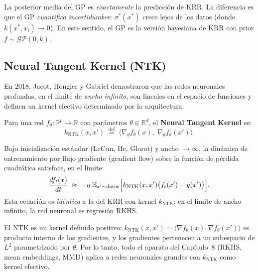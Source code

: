 \begin{remark}[GP $=$ KRR + incertidumbre]
	La posterior media del GP es \emph{exactamente} la predicci\'on de KRR.  La diferencia es que el GP \emph{cuantifica incertidumbre}: $\sigma^*(x^*)$ crece lejos de los datos (donde $k(x^*, x_i) \to 0$).  En este sentido, el GP es la versi\'on bayesiana de KRR con prior $f \sim \mathcal{GP}(0, k)$.
\end{remark}

\subsection*{Neural Tangent Kernel (NTK)}

En 2018, Jacot, Hongler y Gabriel demostraron que las redes neuronales profundas, en el l\'imite de \emph{ancho infinito}, son lineales en el espacio de funciones y definen un kernel efectivo determinado por la arquitectura.

\begin{definition}
	Para una red $f_\theta\colon \mathbb{R}^p \to \mathbb{R}$ con par\'ametros $\theta \in \mathbb{R}^d$, el \textbf{Neural Tangent Kernel} es:
	\[
	k_{\mathrm{NTK}}(x, x') \;\stackrel{\text{def}}{=}\; \bigl\langle \nabla_\theta f_\theta(x),\; \nabla_\theta f_\theta(x') \bigr\rangle.
	\]
\end{definition}

\begin{theorem}
	Bajo inicializaci\'on est\'andar (LeCun, He, Glorot) y ancho $\to \infty$, la din\'amica de entrenamiento por flujo gradiente (gradient flow) sobre la funci\'on de p\'erdida cuadr\'atica satisface, en el l\'imite:
	\[
	\frac{d f_t(x)}{dt} \;\approx\; -\eta\;\mathbb{E}_{x'\sim\text{datos}}\Bigl[k_{\mathrm{NTK}}(x, x')\bigl(f_t(x') - y(x')\bigr)\Bigr].
	\]
	Esta ecuaci\'on es \emph{id\'entica} a la del KRR con kernel $k_{\mathrm{NTK}}$: en el l\'imite de ancho infinito, la red neuronal es regresi\'on RKHS.
\end{theorem}

\begin{lemma}
	El NTK es un kernel definido positivo: $k_{\mathrm{NTK}}(x,x') = \langle \nabla f_\theta(x), \nabla f_\theta(x')\rangle$ es producto interno de los gradientes, y los gradientes pertenecen a un subespacio de $L^2$ parametrizado por $\theta$.  Por lo tanto, todo el aparato del Cap\'itulo~8 (RKHS, mean embeddings, MMD) aplica a redes neuronales grandes con $k_{\mathrm{NTK}}$ como kernel efectivo.
\end{lemma}

